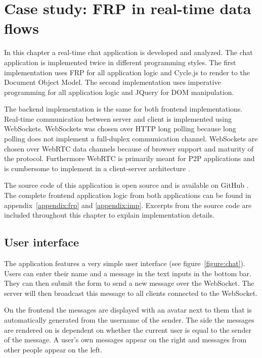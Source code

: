 \chapter{Case study: FRP in real-time data flows} %
\label{sec:uitwerking}

In this chapter a real-time chat application is developed and analyzed. The chat application is implemented twice in different programming styles. The first implementation uses FRP for all application logic and Cycle.js to render to the Document Object Model. The second implementation uses imperative programming for all application logic and JQuery for DOM manipulation.

The backend implementation is the same for both frontend implementations. Real-time communication between server and client is implemented using WebSockets. WebSockets was chosen over HTTP long polling because long polling does not implement a full-duplex communication channel. WebSockets are chosen over WebRTC data channels because of browser support and maturity of the protocol. Furthermore WebRTC is primarily meant for P2P applications and is cumbersome to implement in a client-server architecture \cite{hn}.

The source code of this application is open source and is available on GitHub \cite{chat-code}. The complete frontend application logic from both applications can be found in appendix~\ref{appendix:frp} and \ref{appendix:imp}. Excerpts from the source code are included throughout this chapter to explain implementation details.

\section{User interface}

The application features a very simple user interface (see figure~\ref{figure:chat}). Users can enter their name and a message in the text inputs in the bottom bar. They can then submit the form to send a new message over the WebSocket. The server will then broadcast this message to all clients connected to the WebSocket. 

On the frontend the messages are displayed with an avatar next to them that is automatically generated from the username of the sender. The side the messages are rendered on is dependent on whether the current user is equal to the sender of the message. A user's own messages appear on the right and messages from other people appear on the left.

